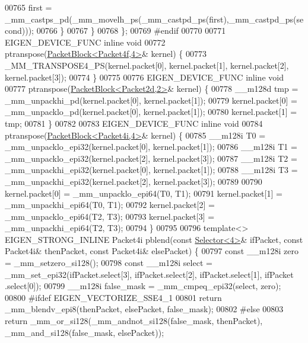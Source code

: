\begin{DoxyCode}
{{00765       first = \_mm\_castps\_pd(\_mm\_movelh\_ps(\_mm\_castpd\_ps(first),\_mm\_castpd\_ps(second)));
00766     \}
00767   \}
00768 \};
00769 \textcolor{preprocessor}{#endif}
00770 
00771 EIGEN\_DEVICE\_FUNC \textcolor{keyword}{inline} \textcolor{keywordtype}{void}
00772 ptranspose(\hyperlink{struct_eigen_1_1internal_1_1_packet_block}{PacketBlock<Packet4f,4>}& kernel) \{
00773   \_MM\_TRANSPOSE4\_PS(kernel.packet[0], kernel.packet[1], kernel.packet[2], kernel.packet[3]);
00774 \}
00775 
00776 EIGEN\_DEVICE\_FUNC \textcolor{keyword}{inline} \textcolor{keywordtype}{void}
00777 ptranspose(\hyperlink{struct_eigen_1_1internal_1_1_packet_block}{PacketBlock<Packet2d,2>}& kernel) \{
00778   \_\_m128d tmp = \_mm\_unpackhi\_pd(kernel.packet[0], kernel.packet[1]);
00779   kernel.packet[0] = \_mm\_unpacklo\_pd(kernel.packet[0], kernel.packet[1]);
00780   kernel.packet[1] = tmp;
00781 \}
00782 
00783 EIGEN\_DEVICE\_FUNC \textcolor{keyword}{inline} \textcolor{keywordtype}{void}
00784 ptranspose(\hyperlink{struct_eigen_1_1internal_1_1_packet_block}{PacketBlock<Packet4i,4>}& kernel) \{
00785   \_\_m128i T0 = \_mm\_unpacklo\_epi32(kernel.packet[0], kernel.packet[1]);
00786   \_\_m128i T1 = \_mm\_unpacklo\_epi32(kernel.packet[2], kernel.packet[3]);
00787   \_\_m128i T2 = \_mm\_unpackhi\_epi32(kernel.packet[0], kernel.packet[1]);
00788   \_\_m128i T3 = \_mm\_unpackhi\_epi32(kernel.packet[2], kernel.packet[3]);
00789 
00790   kernel.packet[0] = \_mm\_unpacklo\_epi64(T0, T1);
00791   kernel.packet[1] = \_mm\_unpackhi\_epi64(T0, T1);
00792   kernel.packet[2] = \_mm\_unpacklo\_epi64(T2, T3);
00793   kernel.packet[3] = \_mm\_unpackhi\_epi64(T2, T3);
00794 \}
00795 
00796 \textcolor{keyword}{template}<> EIGEN\_STRONG\_INLINE Packet4i pblend(\textcolor{keyword}{const} \hyperlink{struct_eigen_1_1internal_1_1_selector}{Selector<4>}& ifPacket, \textcolor{keyword}{const} Packet4i& 
      thenPacket, \textcolor{keyword}{const} Packet4i& elsePacket) \{
00797   \textcolor{keyword}{const} \_\_m128i zero = \_mm\_setzero\_si128();
00798   \textcolor{keyword}{const} \_\_m128i select = \_mm\_set\_epi32(ifPacket.select[3], ifPacket.select[2], ifPacket.select[1], ifPacket
      .select[0]);
00799   \_\_m128i false\_mask = \_mm\_cmpeq\_epi32(select, zero);
00800 \textcolor{preprocessor}{#ifdef EIGEN\_VECTORIZE\_SSE4\_1}
00801   \textcolor{keywordflow}{return} \_mm\_blendv\_epi8(thenPacket, elsePacket, false\_mask);
00802 \textcolor{preprocessor}{#else}
00803   \textcolor{keywordflow}{return} \_mm\_or\_si128(\_mm\_andnot\_si128(false\_mask, thenPacket), \_mm\_and\_si128(false\_mask, elsePacket));
}}
\end{DoxyCode}
